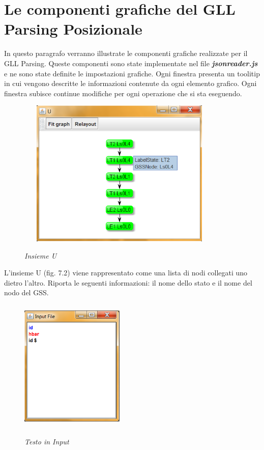 \section{Le componenti grafiche del GLL Parsing Posizionale}
In questo paragrafo verranno illustrate le componenti grafiche realizzate per il GLL Parsing. Queste componenti sono state implementate nel file \textbf{\textit{jsonreader.js}} e ne sono state definite le impostazioni grafiche. Ogni finestra presenta un toolitip in cui vengono descritte le informazioni contenute da ogni elemento grafico. Ogni finestra subisce continue modifiche per ogni operazione che si sta eseguendo.\par
\begin{figure}[hbpb]\label{insiemeU}
	\centering
	{\includegraphics[height=200pt,width=280pt,scale=0.1]{files/InsiemeU.png}}
	\caption{\textit{Insieme U}}
\end{figure}
\noindent L'insieme U (fig. 7.2) viene rappresentato come una lista di nodi collegati uno dietro l'altro. Riporta le seguenti informazioni: il nome dello stato e il nome del nodo del GSS.\par
\begin{figure}[h]\label{input}
	\centering
	{\includegraphics[height=180pt,width=140pt,scale=0.1]{files/Input.png}}
	\caption{\textit{Testo in Input}}
\end{figure}
